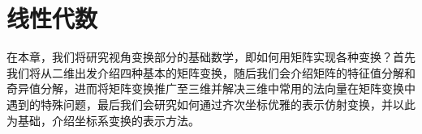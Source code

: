 \chapter{线性代数}

在本章，我们将研究视角变换部分的基础数学，即如何用矩阵实现各种变换？首先我们将从二维出发介绍四种基本的矩阵变换，随后我们会介绍矩阵的特征值分解和奇异值分解，进而将矩阵变换推广至三维并解决三维中常用的法向量在矩阵变换中遇到的特殊问题，最后我们会研究如何通过齐次坐标优雅的表示仿射变换，并以此为基础，介绍坐标系变换的表示方法。





